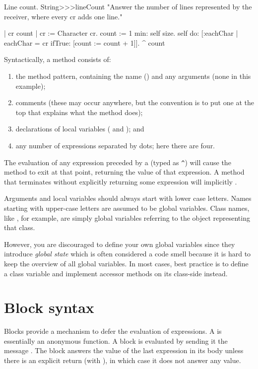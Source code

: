 \documentclass[a4paper,10pt,twoside]{book}
\begin{document}
\begin{method}[lineCount]{Line count.}
String>>>lineCount
   "Answer the number of lines represented by the receiver,
   where every cr adds one line."

   | cr count |
   cr := Character cr.
   count := 1 min: self size.
   self do: [:eachChar |
      eachChar = cr ifTrue: [count := count + 1]].
   ^ count
\end{method}

Syntactically, a method consists of:
\begin{enumerate}
  \item the method pattern, containing the name (\ie {}) and any arguments (none in this example);
  \item comments (these may occur anywhere, but the convention is to put one at the top that explains what the method does);
  \item declarations of local variables (\ie {} and ); and
  \item any number of expressions separated by dots; here there are four.
\end{enumerate}

The evaluation of any expression preceded by a \ct{^} (typed as \verb|^|) will cause the method to exit at that point, returning the value of that expression.
A method that terminates without explicitly returning some expression will implicitly  .

Arguments and local variables should always start with lower case letters.
Names starting with upper-case letters are assumed to be global variables.
Class names, like , for example, are simply global variables referring to the object representing that class.

However, you are discouraged to define your own global variables since they introduce \emph{global state} which is often considered a code smell because it is hard to keep the overview of all global variables.
In most cases, best practice is to define a class variable and implement accessor methods on its class-side instead.

\section{Block syntax}

Blocks provide a mechanism to defer the evaluation of expressions.
A  is essentially an anonymous function.
A block is evaluated by sending it the message .
The block answers the value of the last expression in its body unless there is an explicit return (with \ct{^}), in which case it does not answer any value.
\end{document}
